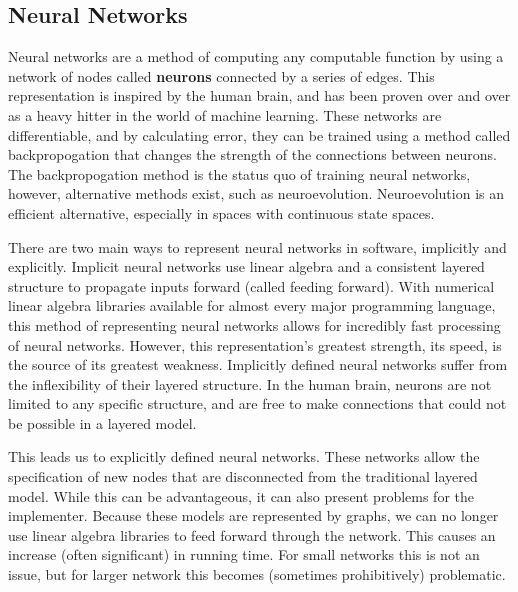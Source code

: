 \documentclass{article}
\begin{document}
\begin{multicols}{2}
\subsection{Neural Networks}
Neural networks are a method of computing any computable function by using a
network of nodes called \textbf{neurons} connected by a series of edges. This
representation is inspired by the human brain, and has been proven over and over
as a heavy hitter in the world of machine learning. These networks are
differentiable, and by calculating error, they can be trained using a method
called backpropogation that changes the strength of the connections between
neurons. The backpropogation method is the status quo of training neural
networks, however, alternative methods exist, such as neuroevolution.
Neuroevolution is an efficient alternative, especially in spaces with
continuous state spaces.

There are two main ways to represent neural networks in software, implicitly and
explicitly. Implicit neural networks use linear algebra and a consistent layered
structure to propagate inputs forward (called feeding forward). With numerical
linear algebra libraries available for almost every major programming language,
this method of representing neural networks allows for incredibly fast
processing
of neural networks. However, this representation's greatest strength, its speed,
is the source of its greatest weakness. Implicitly defined neural networks
suffer
from the inflexibility of their layered structure. In the human brain, neurons
are not limited to any specific structure, and are free to make connections
that could not be possible in a layered model.

This leads us to explicitly defined neural networks. These networks allow the
specification of new nodes that are disconnected from the traditional layered
model. While this can be advantageous, it can also present problems for the
implementer. Because these models are represented by graphs, we can no longer
use linear algebra libraries to feed forward through the network. This causes
an increase (often significant) in running time. For small networks this is
not an issue, but for larger network this becomes (sometimes prohibitively)
problematic.


\end{multicols}
\end{document}
